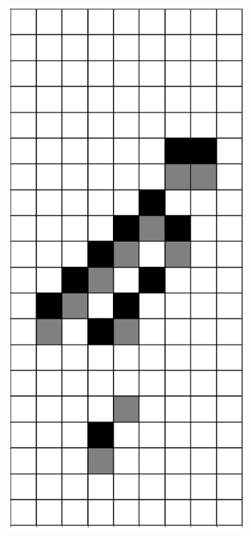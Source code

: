 \documentclass[12pt]{article}
\numberwithin{figure}{section} %
\begin{document}
\begin{figure}[H]
\begin{subfigure}{0.3\textwidth}
     		\subcaption{}
   	\end{subfigure}
     	\begin{subfigure}{0.3\textwidth}
     		\centering
     		\includegraphics[angle=270,width=\linewidth]{Section4/22.4}

\end{subfigure}
\end{figure}
\end{document}
